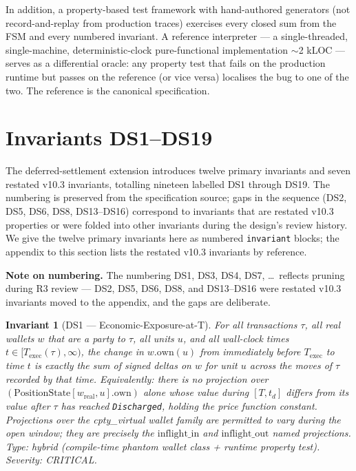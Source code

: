 \documentclass[11pt,a4paper]{article}
\newtheorem{invariant}[definition]{Invariant}
\begin{document}
In addition, a property-based test framework with hand-authored generators (not record-and-replay from production traces) exercises every closed sum from the FSM and every numbered invariant. A reference interpreter --- a single-threaded, single-machine, deterministic-clock pure-functional implementation $\sim$2 kLOC --- serves as a differential oracle: any property test that fails on the production runtime but passes on the reference (or vice versa) localises the bug to one of the two. The reference is the canonical specification.

\clearpage
\section{Invariants DS1--DS19}
\label{sec:invariants}

The deferred-settlement extension introduces twelve primary invariants and seven restated v10.3 invariants, totalling nineteen labelled DS1 through DS19. The numbering is preserved from the specification source; gaps in the sequence (DS2, DS5, DS6, DS8, DS13--DS16) correspond to invariants that are restated v10.3 properties or were folded into other invariants during the design's review history. We give the twelve primary invariants here as numbered \texttt{invariant} blocks; the appendix to this section lists the restated v10.3 invariants by reference.

\textbf{Note on numbering.} The numbering DS1, DS3, DS4, DS7, \ldots\ reflects pruning during R3 review --- DS2, DS5, DS6, DS8, and DS13--DS16 were restated v10.3 invariants moved to the appendix, and the gaps are deliberate.

\begin{invariant}[DS1 --- Economic-Exposure-at-T]
\label{inv:DS1}
For all transactions $\tau$, all real wallets $w$ that are a party to $\tau$, all units $u$, and all wall-clock times $t \in [T_{\mathrm{exec}}(\tau), \infty)$, the change in $w.\mathrm{own}(u)$ from immediately before $T_{\mathrm{exec}}$ to time $t$ is exactly the sum of signed deltas on $w$ for unit $u$ across the moves of $\tau$ recorded by that time. Equivalently: there is no projection over $(\mathrm{PositionState}[w_{\mathrm{real}}, u].\mathrm{own})$ alone whose value during $[T, t_d]$ differs from its value after $\tau$ has reached \texttt{Discharged}, holding the price function constant. Projections over the cpty\_virtual wallet family \emph{are} permitted to vary during the open window; they are precisely the $\mathrm{inflight\_in}$ and $\mathrm{inflight\_out}$ named projections.
\textit{Type:} hybrid (compile-time phantom wallet class + runtime property test). \textit{Severity:} CRITICAL.
\end{invariant}
\end{document}
